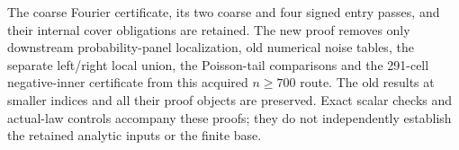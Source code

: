 \documentclass[11pt]{article}
\begin{document}
The coarse Fourier certificate, its two coarse and four signed entry passes,
and their internal cover obligations are retained. The new proof removes
only downstream probability-panel localization, old numerical noise tables,
the separate left/right local union, the Poisson-tail comparisons and the
291-cell negative-inner certificate from this acquired $n\ge700$ route.
The old results at smaller indices and all their proof objects are preserved.
Exact scalar checks and actual-law controls accompany these proofs; they
do not independently establish the retained analytic inputs or the finite base.
\end{document}
